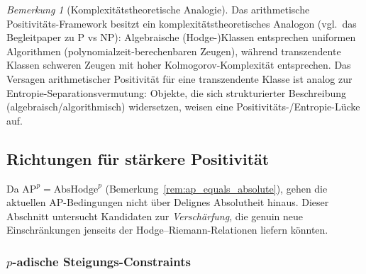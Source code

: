 \documentclass[aps,prd,twocolumn,superscriptaddress,nofootinbib]{revtex4-2}
\theoremstyle{definition}
\theoremstyle{remark}
\newtheorem{remark}[theorem]{Bemerkung}
\begin{document}
\begin{remark}[Komplexitätstheoretische Analogie]
\label{rem:pnp-analogy}
Das arithmetische Positivitäts-Framework besitzt ein komplexitätstheoretisches Analogon (vgl.\ das Begleitpaper zu P vs NP): Algebraische (Hodge-)Klassen entsprechen \glqq uniformen Algorithmen\grqq{} (polynomialzeit-berechenbaren Zeugen), während transzendente Klassen \glqq schweren Zeugen\grqq{} mit hoher Kolmogorov-Komplexität entsprechen. Das Versagen arithmetischer Positivität für eine transzendente Klasse ist analog zur Entropie-Separationsvermutung: Objekte, die sich strukturierter Beschreibung (algebraisch/algorithmisch) widersetzen, weisen eine Positivitäts-/Entropie-Lücke auf.
\end{remark}


\subsection{Richtungen für stärkere Positivität}
\label{sec:stronger_positivity}

Da $\mathrm{AP}^p = \mathrm{AbsHodge}^p$ (Bemerkung~\ref{rem:ap_equals_absolute}), gehen die aktuellen AP-Bedingungen nicht über Delignes Absolutheit hinaus. Dieser Abschnitt untersucht Kandidaten zur \textit{Verschärfung}, die genuin neue Einschränkungen jenseits der Hodge--Riemann-Relationen liefern könnten.

\subsubsection{\texorpdfstring{$p$-adische Steigungs-Constraints}{p-adische Steigungs-Constraints}}
\end{document}

